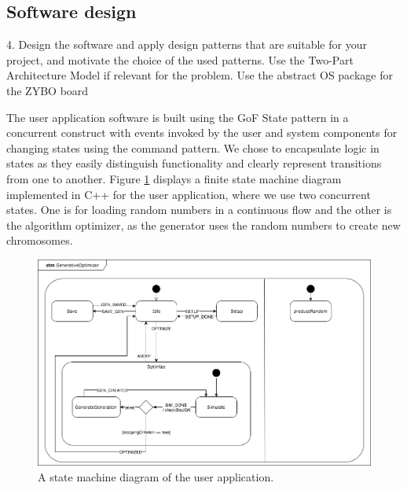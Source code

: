 \subsection{Software design}
\begin{framed}
4. Design the software and apply design patterns that are suitable for your project, and motivate the choice of the used patterns. Use the Two-Part Architecture Model if relevant for the problem. Use the abstract OS package for the ZYBO board
\end{framed}

The user application software is built using the GoF State pattern in a concurrent construct with events invoked by the user and system components for changing states using the command pattern. We chose to encapsulate logic in states as they easily distinguish functionality and clearly represent transitions from one to another. Figure \ref{fig:statemachine} displays a finite state machine diagram implemented in C++ for the user application, where we use two concurrent states. One is for loading random numbers in a continuous flow and the other is the algorithm optimizer, as the generator uses the random numbers to create new chromosomes.

\begin{figure}[h!]
	\centering
	\includegraphics[width=0.9\linewidth]{../diagrams/statemachine.png}
	\caption{A state machine diagram of the user application.}
	\label{fig:statemachine}
\end{figure}

